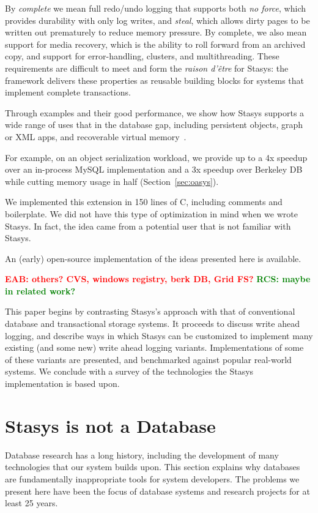 \documentclass[letterpaper,twocolumn,10pt]{article}
\newcommand{\yad}{Stasys\xspace}
\newcommand{\eab}[1]{\textcolor{red}{\bf EAB: #1}}
\newcommand{\rcs}[1]{\textcolor{green}{\bf RCS: #1}}
\begin{document}
By {\em complete} we mean full redo/undo logging that supports
both {\em no force}, which provides durability with only log writes,
and {\em steal}, which allows dirty pages to be written out prematurely
to reduce memory pressure. By complete, we also
mean support for media recovery, which is the ability to roll
forward from an archived copy, and support for error-handling,
clusters, and multithreading. These requirements are difficult
to meet and form the {\em raison d'\^etre} for \yad{}: the framework
delivers these properties as reusable building blocks for systems
that implement complete transactions.

Through examples and their good performance, we show how \yad{}
supports a wide range of uses that in the database gap, including
persistent objects, graph or XML apps, and recoverable
virtual memory~\cite{lrvm}.  

For example, on an object serialization workload, we provide up to 
a 4x speedup over an in-process 
MySQL implementation and a 3x speedup over Berkeley DB while 
cutting memory usage in half (Section~\ref{sec:oasys}). 

We implemented this extension in 150 lines of C, including comments and boilerplate.  We did not have this type of optimization
in mind when we wrote \yad.  In fact, the idea came from a potential 
user that is not familiar with \yad.

An (early) open-source implementation of
the ideas presented here is available.

\eab{others?  CVS, windows registry, berk DB, Grid FS?}
\rcs{maybe in related work?}

This paper begins by contrasting \yad's approach with that of
conventional database and transactional storage systems.  It proceeds
to discuss write ahead logging, and describe ways in which \yad can be
customized to implement many existing (and some new) write ahead
logging variants.  Implementations of some of these variants are
presented, and benchmarked against popular real-world systems.  We
conclude with a survey of the technologies the \yad implementation is
based upon.

\section{\yad is not a Database}
\label{sec:notDB}
Database research has a long history, including the development of
many technologies that our system builds upon.  This section explains
why databases are fundamentally inappropriate tools for system
developers.  The problems we present here have been the focus of
database systems and research projects for at least 25 years.
\end{document}
